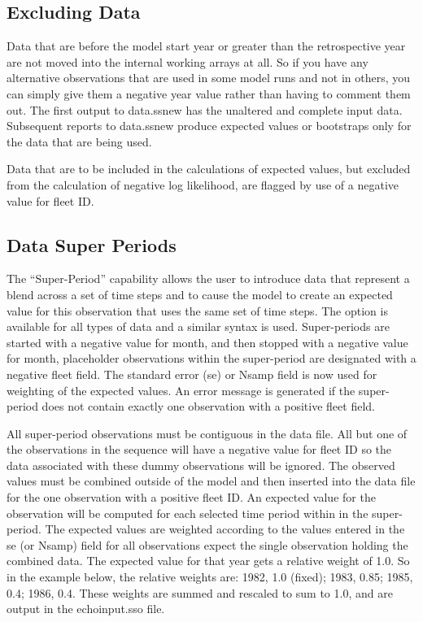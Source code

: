 \subsection{Excluding Data}
Data that are before the model start year or greater than the retrospective year are not moved into the internal working arrays at all.  So if you have any alternative observations that are used in some model runs and not in others, you can simply give them a negative year value rather than having to comment them out. The first output to data.ss\textunderscore new has the unaltered and complete input data.  Subsequent reports to data.ss\textunderscore new produce expected values or bootstraps only for the data that are being used.

Data that are to be included in the calculations of expected values, but excluded from the calculation of negative log likelihood, are flagged by use of a negative value for fleet ID.

\subsection{Data Super Periods}
The “Super-Period” capability allows the user to introduce data that represent a blend across a set of time steps and to cause the model to create an expected value for this observation that uses the same set of time steps.  The option is available for all types of data and a similar syntax is used.  Super-periods are started with a negative value for month, and then stopped with a negative value for month, placeholder observations within the super-period are designated with a negative fleet field.  The standard error (se) or Nsamp field is now used for weighting of the expected values.  An error message is generated if the super-period does not contain exactly one observation with a positive fleet field.

All super-period observations must be contiguous in the data file.  All but one of the observations in the sequence will have a negative value for fleet ID so the data associated with these dummy observations will be ignored. The observed values must be combined outside of the model and then inserted into the data file for the one observation with a positive fleet ID.
An expected value for the observation will be computed for each selected time period within in the super-period.  The expected values are weighted according to the values entered in the se (or Nsamp) field for all observations expect the single observation holding the combined data.  The expected value for that year gets a relative weight of 1.0.  So in the example below, the relative weights are:  1982, 1.0 (fixed); 1983, 0.85; 1985, 0.4; 1986, 0.4.  These weights are summed and rescaled to sum to 1.0, and are output in the echoinput.sso file.


